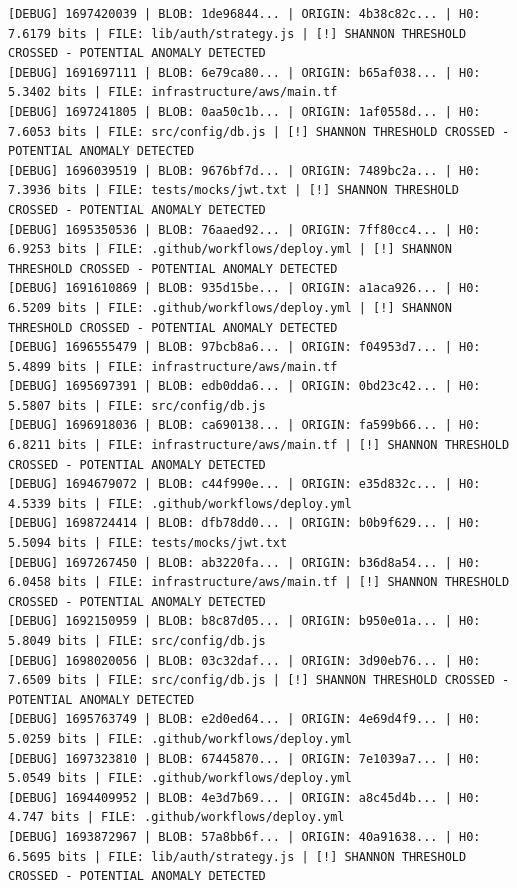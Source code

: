 \documentclass[12pt, a4paper, oneside]{report}
\begin{document}
\newpage
\begin{lstlisting}[basicstyle=\tiny\ttfamily]
[DEBUG] 1697420039 | BLOB: 1de96844... | ORIGIN: 4b38c82c... | H0: 7.6179 bits | FILE: lib/auth/strategy.js | [!] SHANNON THRESHOLD CROSSED - POTENTIAL ANOMALY DETECTED
[DEBUG] 1691697111 | BLOB: 6e79ca80... | ORIGIN: b65af038... | H0: 5.3402 bits | FILE: infrastructure/aws/main.tf
[DEBUG] 1697241805 | BLOB: 0aa50c1b... | ORIGIN: 1af0558d... | H0: 7.6053 bits | FILE: src/config/db.js | [!] SHANNON THRESHOLD CROSSED - POTENTIAL ANOMALY DETECTED
[DEBUG] 1696039519 | BLOB: 9676bf7d... | ORIGIN: 7489bc2a... | H0: 7.3936 bits | FILE: tests/mocks/jwt.txt | [!] SHANNON THRESHOLD CROSSED - POTENTIAL ANOMALY DETECTED
[DEBUG] 1695350536 | BLOB: 76aaed92... | ORIGIN: 7ff80cc4... | H0: 6.9253 bits | FILE: .github/workflows/deploy.yml | [!] SHANNON THRESHOLD CROSSED - POTENTIAL ANOMALY DETECTED
[DEBUG] 1691610869 | BLOB: 935d15be... | ORIGIN: a1aca926... | H0: 6.5209 bits | FILE: .github/workflows/deploy.yml | [!] SHANNON THRESHOLD CROSSED - POTENTIAL ANOMALY DETECTED
[DEBUG] 1696555479 | BLOB: 97bcb8a6... | ORIGIN: f04953d7... | H0: 5.4899 bits | FILE: infrastructure/aws/main.tf
[DEBUG] 1695697391 | BLOB: edb0dda6... | ORIGIN: 0bd23c42... | H0: 5.5807 bits | FILE: src/config/db.js
[DEBUG] 1696918036 | BLOB: ca690138... | ORIGIN: fa599b66... | H0: 6.8211 bits | FILE: infrastructure/aws/main.tf | [!] SHANNON THRESHOLD CROSSED - POTENTIAL ANOMALY DETECTED
[DEBUG] 1694679072 | BLOB: c44f990e... | ORIGIN: e35d832c... | H0: 4.5339 bits | FILE: .github/workflows/deploy.yml
[DEBUG] 1698724414 | BLOB: dfb78dd0... | ORIGIN: b0b9f629... | H0: 5.5094 bits | FILE: tests/mocks/jwt.txt
[DEBUG] 1697267450 | BLOB: ab3220fa... | ORIGIN: b36d8a54... | H0: 6.0458 bits | FILE: infrastructure/aws/main.tf | [!] SHANNON THRESHOLD CROSSED - POTENTIAL ANOMALY DETECTED
[DEBUG] 1692150959 | BLOB: b8c87d05... | ORIGIN: b950e01a... | H0: 5.8049 bits | FILE: src/config/db.js
[DEBUG] 1698020056 | BLOB: 03c32daf... | ORIGIN: 3d90eb76... | H0: 7.6509 bits | FILE: src/config/db.js | [!] SHANNON THRESHOLD CROSSED - POTENTIAL ANOMALY DETECTED
[DEBUG] 1695763749 | BLOB: e2d0ed64... | ORIGIN: 4e69d4f9... | H0: 5.0259 bits | FILE: .github/workflows/deploy.yml
[DEBUG] 1697323810 | BLOB: 67445870... | ORIGIN: 7e1039a7... | H0: 5.0549 bits | FILE: .github/workflows/deploy.yml
[DEBUG] 1694409952 | BLOB: 4e3d7b69... | ORIGIN: a8c45d4b... | H0: 4.747 bits | FILE: .github/workflows/deploy.yml
[DEBUG] 1693872967 | BLOB: 57a8bb6f... | ORIGIN: 40a91638... | H0: 6.5695 bits | FILE: lib/auth/strategy.js | [!] SHANNON THRESHOLD CROSSED - POTENTIAL ANOMALY DETECTED

\end{lstlisting}
\end{document}
